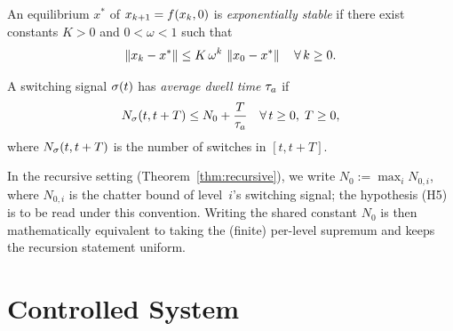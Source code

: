 \documentclass[11pt,a4paper]{article}
\begin{document}
\begin{definition}
An equilibrium $x^*$ of $x_{k+1} = f(x_k, 0)$ is \emph{exponentially
stable} if there exist constants $K > 0$ and $0 < \omega < 1$ such that
\begin{equation}
  \left\| x_k - x^* \right\| \leq K \, \omega^k \, \left\| x_0 - x^* \right\|
  \quad \forall\, k \geq 0.
\end{equation}
\end{definition}

\begin{definition}
\label{def:dwell-time}
A switching signal $\sigma(t)$ has \emph{average dwell time} $\taua$ if
\begin{equation}
  N_\mode(t, t+T) \leq N_0 + \frac{T}{\taua}
  \quad \forall\, t \geq 0,\; T \geq 0,
\end{equation}
where $N_\sigma(t, t+T)$ is the number of switches in $[t, t+T]$.
\end{definition}

\begin{remark}
\label{rem:N0-standing-max}
In the recursive setting (Theorem~\ref{thm:recursive}), we write
$N_0 := \max_i N_{0,i}$, where $N_{0,i}$ is the chatter bound of
level~$i$'s switching signal; the hypothesis (H5) is to be read under
this convention.  Writing the shared constant $N_0$ is then
mathematically equivalent to taking the (finite) per-level supremum
and keeps the recursion statement uniform.
\end{remark}


\section{Controlled System}
\label{sec:controlled-system}
\end{document}
